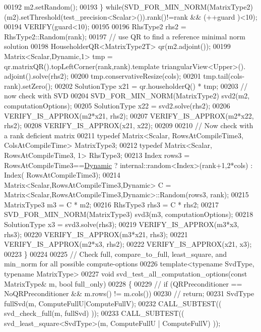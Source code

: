 \begin{DoxyCode}
00192     m2.setRandom();
00193   \} \textcolor{keywordflow}{while}(SVD\_FOR\_MIN\_NORM(MatrixType2)(m2).setThreshold(test\_precision<Scalar>()).rank()!=rank && (++guard
      )<10);
00194   VERIFY(guard<10);
00195 
00196   RhsType2 rhs2 = RhsType2::Random(rank);
00197   \textcolor{comment}{// use QR to find a reference minimal norm solution}
00198   HouseholderQR<MatrixType2T> qr(m2.adjoint());
00199   Matrix<Scalar,Dynamic,1> tmp = qr.matrixQR().topLeftCorner(rank,rank).template triangularView<Upper>().
      adjoint().solve(rhs2);
00200   tmp.conservativeResize(cols);
00201   tmp.tail(cols-rank).setZero();
00202   SolutionType x21 = qr.householderQ() * tmp;
00203   \textcolor{comment}{// now check with SVD}
00204   SVD\_FOR\_MIN\_NORM(MatrixType2) svd2(m2, computationOptions);
00205   SolutionType x22 = svd2.solve(rhs2);
00206   VERIFY\_IS\_APPROX(m2*x21, rhs2);
00207   VERIFY\_IS\_APPROX(m2*x22, rhs2);
00208   VERIFY\_IS\_APPROX(x21, x22);
00209 
00210   \textcolor{comment}{// Now check with a rank deficient matrix}
00211   \textcolor{keyword}{typedef} Matrix<Scalar, RowsAtCompileTime3, ColsAtCompileTime> MatrixType3;
00212   \textcolor{keyword}{typedef} Matrix<Scalar, RowsAtCompileTime3, 1> RhsType3;
00213   Index rows3 = RowsAtCompileTime3==\hyperlink{namespace_eigen_ad81fa7195215a0ce30017dfac309f0b2}{Dynamic} ? internal::random<Index>(rank+1,2*cols) : Index(
      RowsAtCompileTime3);
00214   Matrix<Scalar,RowsAtCompileTime3,Dynamic> C = Matrix<Scalar,RowsAtCompileTime3,Dynamic>::Random(rows3,
      rank);
00215   MatrixType3 m3 = C * m2;
00216   RhsType3 rhs3 = C * rhs2;
00217   SVD\_FOR\_MIN\_NORM(MatrixType3) svd3(m3, computationOptions);
00218   SolutionType x3 = svd3.solve(rhs3);
00219   VERIFY\_IS\_APPROX(m3*x3, rhs3);
00220   VERIFY\_IS\_APPROX(m3*x21, rhs3);
00221   VERIFY\_IS\_APPROX(m2*x3, rhs2);
00222   VERIFY\_IS\_APPROX(x21, x3);
00223 \}
00224 
00225 \textcolor{comment}{// Check full, compare\_to\_full, least\_square, and min\_norm for all possible compute-options}
00226 \textcolor{keyword}{template}<\textcolor{keyword}{typename} SvdType, \textcolor{keyword}{typename} MatrixType>
00227 \textcolor{keywordtype}{void} svd\_test\_all\_computation\_options(\textcolor{keyword}{const} MatrixType& m, \textcolor{keywordtype}{bool} full\_only)
00228 \{
00229 \textcolor{comment}{//   if (QRPreconditioner == NoQRPreconditioner && m.rows() != m.cols())}
00230 \textcolor{comment}{//     return;}
00231   SvdType fullSvd(m, ComputeFullU|ComputeFullV);
00232   CALL\_SUBTEST(( svd\_check\_full(m, fullSvd) ));
00233   CALL\_SUBTEST(( svd\_least\_square<SvdType>(m, ComputeFullU | ComputeFullV) ));

\end{DoxyCode}
